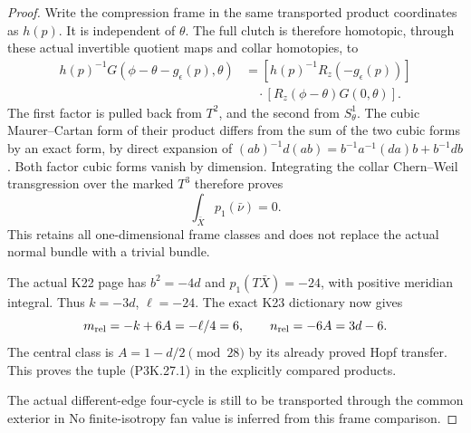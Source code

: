 \begin{proof}
Write the compression frame in the same transported product
coordinates as \(h(p)\). It is independent of \(\theta\).
The full clutch is therefore homotopic, through these actual
invertible quotient maps and collar homotopies, to
\[
\begin{aligned}
 h(p)^{-1}G(\phi-\theta-g_\epsilon(p),\theta)
   &=[h(p)^{-1}R_z(-g_\epsilon(p))]\\
   &\quad\cdot[R_z(\phi-\theta)G(0,\theta)].
\end{aligned}
\]
The first factor is pulled back from \(T^2\), and the second
from \(S^1_\theta\). The cubic Maurer--Cartan form of their
product differs from the sum of the two cubic forms by an
exact form, by direct expansion of
\((ab)^{-1}d(ab)=b^{-1}a^{-1}(da)b+b^{-1}db\).
Both factor cubic forms vanish by dimension. Integrating
the collar Chern--Weil transgression over the marked \(T^3\)
therefore proves
\[
                     \int_{\bar X}p_1(\bar\nu)=0.
\]
This retains all one-dimensional frame classes and does not
replace the actual normal bundle with a trivial bundle.

The actual K22 page has
\(b^2=-4d\) and \(p_1(T\bar X)=-24\), with positive
meridian integral. Thus \(k=-3d\), \(\ell=-24\).
The exact K23 dictionary now gives
\[
      m_{\rm rel}=-k+6A=-\ell/4=6,\qquad
      n_{\rm rel}=-6A=3d-6.
\]
The central class is \(A=1-d/2\pmod{28}\) by its
already proved Hopf transfer. This proves the
tuple (P3K.27.1) in the explicitly compared products.

The actual different-edge four-cycle is still to be
transported through the common exterior in
 No finite-isotropy
fan value is inferred from this frame comparison.
\end{proof}
